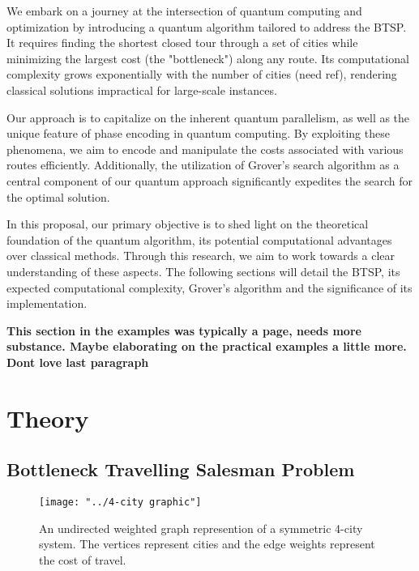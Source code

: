 \documentclass[twocolumn,showpacs,preprintnumbers,amsmath,amssymb]{revtex4}
\begin{document}
		We embark on a journey at the intersection of quantum computing and optimization by introducing a quantum algorithm tailored to address the BTSP. It requires finding the shortest closed tour through a set of cities while minimizing the largest cost (the "bottleneck") along any route. Its computational complexity grows exponentially with the number of cities (need ref), rendering classical solutions impractical for large-scale instances.
		
		Our approach is to capitalize on the inherent quantum parallelism, as well as the unique feature of phase encoding in quantum computing. By exploiting these phenomena, we aim to encode and manipulate the costs associated with various routes efficiently. Additionally, the utilization of Grover's search algorithm as a central component of our quantum approach significantly expedites the search for the optimal solution.
		
		In this proposal, our primary objective is to shed light on the theoretical foundation of the quantum algorithm, its potential computational advantages over classical methods. Through this research, we aim to work towards a clear understanding of these aspects. The following sections will detail the BTSP, its expected computational complexity, Grover's algorithm and the significance of its implementation.
		
		\textbf{This section in the examples was typically a page, needs more substance. Maybe elaborating on the practical examples a little more. Dont love last paragraph} 
		
		
		\section{Theory}
		
		\subsection{Bottleneck Travelling Salesman Problem}
		
		\begin{figure}[!h]
			\centering
			\texttt{[image: "../4-city graphic"]}
			\caption{An undirected weighted graph represention of a  symmetric 4-city system.  The vertices represent cities and the edge weights represent the cost of travel. }
			\label{fig:4-city-graphic}
		\end{figure}		
		
		
		
\end{document}
